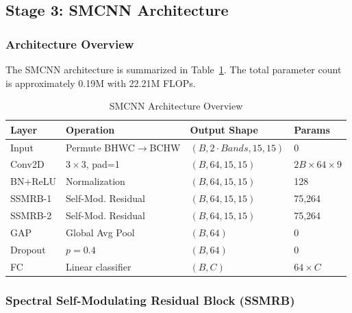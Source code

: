 \documentclass[pdflatex,sn-mathphys-num]{sn-jnl}
\theoremstyle{thmstyleone}
\theoremstyle{thmstyletwo}
\theoremstyle{thmstylethree}
\begin{document}
\subsection{Stage 3: SMCNN Architecture}

\subsubsection{Architecture Overview}

The SMCNN architecture is summarized in Table~\ref{tab:architecture}. The total parameter count is approximately 0.19M with 22.21M FLOPs.

\begin{table}[!t]
\caption{SMCNN Architecture Overview}
\label{tab:architecture}
\centering

\begin{tabular}{llll}
\toprule
\textbf{Layer} & \textbf{Operation} & \textbf{Output Shape} & \textbf{Params} \\
\midrule
Input & Permute BHWC$\rightarrow$BCHW & $(B, 2\!\cdot\!Bands, 15, 15)$ & 0 \\
Conv2D & $3\!\times\!3$, pad=1 & $(B, 64, 15, 15)$ & $2B\!\times\!64\!\times\!9$ \\
BN+ReLU & Normalization & $(B, 64, 15, 15)$ & 128 \\
SSMRB-1 & Self-Mod. Residual & $(B, 64, 15, 15)$ & 75,264 \\
SSMRB-2 & Self-Mod. Residual & $(B, 64, 15, 15)$ & 75,264 \\
GAP & Global Avg Pool & $(B, 64)$ & 0 \\
Dropout & $p = 0.4$ & $(B, 64)$ & 0 \\
FC & Linear classifier & $(B, C)$ & $64\!\times\!C$ \\
\bottomrule
\end{tabular}
\end{table}

\subsubsection{Spectral Self-Modulating Residual Block (SSMRB)}
\end{document}
